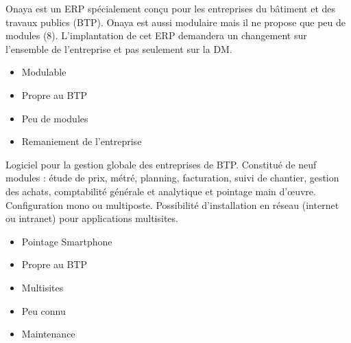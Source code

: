  
 
{
    Onaya est un ERP spécialement conçu pour les entreprises du bâtiment et des travaux publics (BTP).
    Onaya est aussi modulaire mais il ne propose que peu de modules (8).
    L'implantation de cet ERP demandera un changement sur l'ensemble de l'entreprise et pas seulement sur la DM.
}
{
    \begin{itemize}
        \item Modulable
        \item Propre au BTP
    \end{itemize}
}
{
    \begin{itemize}
        \item Peu de modules
        \item Remaniement de l'entreprise
    \end{itemize}
}

{
    Logiciel pour la gestion globale des entreprises de BTP. Constitué de neuf modules : étude de prix, métré, planning, facturation, suivi de chantier, gestion des achats, comptabilité générale et analytique et pointage main d'\oe uvre.
    Configuration mono ou multiposte. Possibilité d'installation en réseau (internet ou intranet) pour applications multisites.
}
{
    \begin{itemize}
      \item Pointage Smartphone
      \item Propre au BTP
      \item Multisites
    \end{itemize}
}
{
    \begin{itemize}
        \item Peu connu
        \item Maintenance%
    \end{itemize}
}


